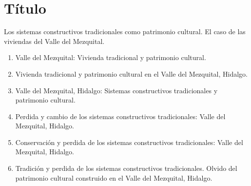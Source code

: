 \section{Título}






Los sistemas constructivos tradicionales como patrimonio cultural. El caso de las viviendas del Valle del Mezquital.

%
%

\begin{enumerate}

	\item Valle del Mezquital: Vivienda tradicional y patrimonio cultural.

	\item Vivienda tradicional y patrimonio cultural en el Valle del Mezquital, Hidalgo.

	\item Valle del Mezquital, Hidalgo: Sistemas constructivos tradicionales y patrimonio cultural.

	\item Perdida y cambio de los sistemas constructivos tradicionales: Valle del Mezquital, Hidalgo.

	\item Conservación y perdida de los sistemas constructivos tradicionales: Valle del Mezquital, Hidalgo.

	\item Tradición y perdida de los sistemas constructivos tradicionales. Olvido del patrimonio cultural construido en el Valle del Mezquital, Hidalgo.

\end{enumerate}

